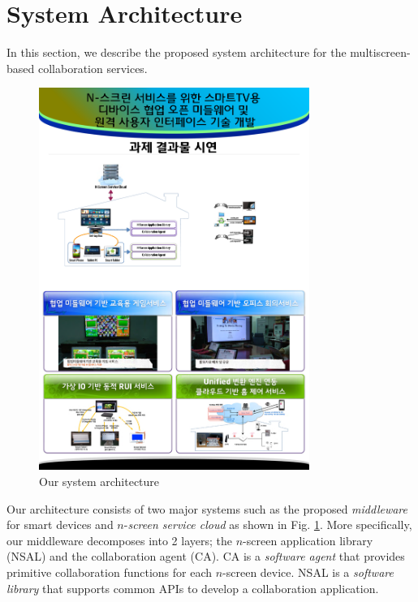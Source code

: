 \documentclass[conference]{IEEEtran}
\begin{document}
\section{System Architecture}
    \label{sc:Architecture}
    In this section, we describe the proposed system architecture for the multiscreen-based collaboration services.
\begin{figure}[htb] %
\centering
\includegraphics[width=8.8cm,keepaspectratio]{systemarchitecture_2}
\caption{Our system architecture}
\label{fig:architecture}
\end{figure}

Our architecture consists of two major systems such as the proposed \textit{middleware} for smart devices and $n$-\textit{screen service cloud} as shown in Fig. \ref{fig:architecture}. More specifically, our middleware decomposes into 2 layers;  the $n$-screen application library (NSAL) and the collaboration agent (CA).  CA is a \textit{software agent} that provides primitive collaboration functions for each $n$-screen device. NSAL is a \textit{software library} that supports common APIs to develop a collaboration application.
\end{document}

